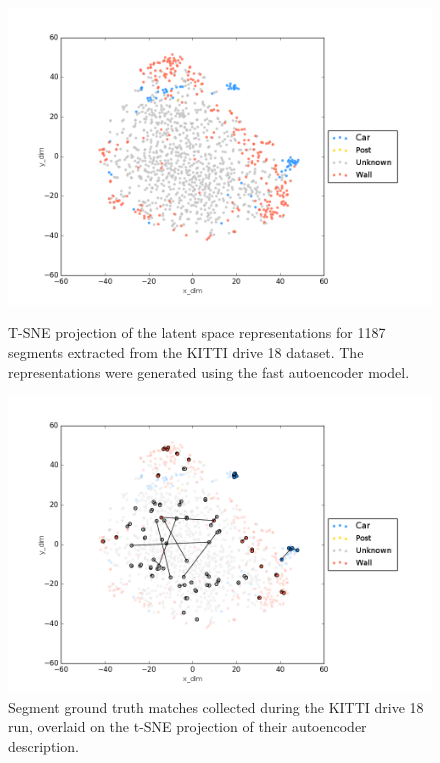 \begin{figure}[p]
  \centering
  \includegraphics[width=5.2in]{images/t-sne.png}
  \caption{T-SNE projection of the latent space representations for 1187 segments extracted from the KITTI drive 18 dataset. The representations were generated using the fast autoencoder model.}
  \label{fig:tsne}
  \hfill
  \includegraphics[width=5.2in]{images/t-sne_matches.png}
  \caption{Segment ground truth matches collected during the KITTI drive 18 run, overlaid on the t-SNE projection of their autoencoder description.}
  \label{fig:tsne_matches}
\end{figure}

